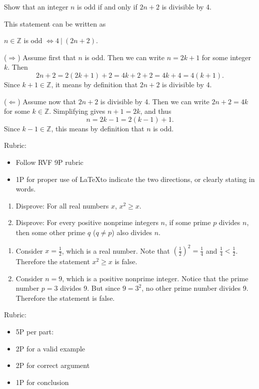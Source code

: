 \documentclass{article}
\theoremstyle{definition}
\begin{document}
\begin{question}
    Show that an integer $n$ is odd if and only if $2n+2$ is divisible by 4.
\end{question}
\begin{solution}
This statement can be written as 
	
	\begin{center}
		$n \in \mathbb{Z}$ is odd $\iff 4 ~|~ (2n+2)$.
	\end{center}
	
 ($\Rightarrow$) Assume first that $n$ is odd. Then we can write $n = 2k+1$ for some integer $k$. Then
	\[
	2 n + 2 = 2 (2k + 1) + 2 = 4 k + 2 + 2 = 4 k + 4 = 4 (k+1).
	\]
	Since $k+1 \in \mathbb{Z}$, it means by definition that $2 n + 2$ is divisible by 4.
	
	($\Leftarrow$)  Assume now that $2n + 2$ is divisible by 4. Then we can write $2n + 2 = 4k$ for some $k \in \mathbb{Z}$. Simplifying gives $n + 1 = 2k$, and thus
	\[
	n = 2 k - 1 = 2 (k - 1) + 1.
	\]
	Since $k - 1 \in \mathbb{Z}$, this means by definition that $n$ is odd.
{\color{red} Rubric:
\begin{itemize}
\item Follow RVF 9P rubric 
\item 1P for proper use of \LaTeX to indicate the two directions, or clearly stating in words.
\end{itemize}}
\end{solution}

\begin{question}
    \begin{enumerate}
        \item Disprove: For all real numbers $x$, $x^2\geq x$.
        \item Disprove: For every positive nonprime integers $n$, if some prime $p$ divides $n$, then some other prime $q$ ($q\neq p$) also divides $n$.
    \end{enumerate}
\end{question}
\begin{solution}
\begin{enumerate}
\item Consider $x=\frac{1}{2}$, which is a real number. Note that $\left(\frac{1}{2}\right)^2=\frac{1}{4}$ and $\frac{1}{4}< \frac{1}{2}$. Therefore the statement $x^2\geq x$ is false.

\item Consider $n=9$, which is a positive nonprime integer. Notice that the prime number $p=3$ divides 9. But since $9=3^2$, no other prime number divides 9. Therefore the statement is false.
\end{enumerate}
{\color{red} Rubric:
\begin{itemize}
\item 5P per part: 
\item 2P for a valid example
\item 2P for correct argument
\item 1P for conclusion
\end{itemize}}
\end{solution}
\end{document}
